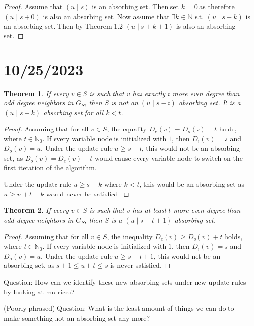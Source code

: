 \documentclass{article}
\newtheorem{thm}{Theorem}[section]
\begin{document}
\begin{proof}
    Assume that $(u\mid s)$ is an absorbing set. Then set $k=0$ as therefore $(u\mid s+0)$ is also an absorbing set. Now assume that $\exists k \in \mathbb{N}$ s.t. $(u \mid s +k)$ is an absorbing set. Then by Theorem 1.2 $(u\mid s+k+1)$ is also an absorbing set.
\end{proof}

\section*{10/25/2023}


\begin{thm}
    If every $v \in S$ is such that $v$ has \textit{exactly} $t$ more even degree than odd degree neighbors in $G_S$, then $S$ is not an $(u \mid s - t)$ absorbing set. It is a $(u \mid s - k)$ absorbing set for all $k < t$.
\end{thm}
\begin{proof}

    Assuming that for all $v \in S$, the equality $D_e(v) = D_o(v) + t$ holds, where $t \in \mathbb{N}_0$. If every variable node is initialized with $1$, then $D_e(v) = s$ and $D_o(v) = u$. Under the update rule $u \geq s - t$, this would not be an absorbing set, as $D_o(v) = D_e(v) - t$ would cause every variable node to switch on the first iteration of the algorithm.

    Under the update rule $u\geq s-k$ where $k<t$, this would be an absorbing set as $u\geq u+t-k$ would never be satisfied.
\end{proof}


\begin{thm}
    If every $v \in S$ is such that $v$ has at least $t$ more even degree than odd degree neighbors in $G_S$, then $S$ is a $(u \mid s - t + 1)$ absorbing set.
\end{thm}
\begin{proof}
    Assuming that for all $v \in S$, the inequality $D_e(v) \geq D_o(v) + t$ holds, where $t \in \mathbb{N}_0$. If every variable node is initialized with $1$, then $D_e(v) = s$ and $D_o(v) = u$. Under the update rule $u \geq s - t + 1$, this would not be an absorbing set, as $s + 1 \leq u + t \leq s$ is never satisfied.
\end{proof}

Question: How can we identify these new absorbing sets under new update rules by looking at matrices?

(Poorly phrased) Question: What is the least amount of things we can do to make something not an absorbing set any more?
\end{document}
